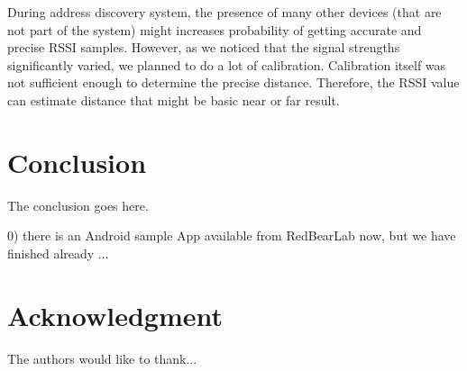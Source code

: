 \documentclass[conference,a4paper]{../../sty/IEEEtran}
\begin{document}
During address discovery system, the presence of many other devices (that are not part of the system) might 
increases probability of getting accurate and precise RSSI samples. However, as we noticed that the signal strengths significantly varied, we planned to do a lot of calibration. Calibration itself was not sufficient enough to determine the precise distance. Therefore, the RSSI value can estimate distance that might be basic near or far result. 

\section{Conclusion}
The conclusion goes here.

0) there is an Android sample App available from RedBearLab now, but we have finished already ...




\section*{Acknowledgment}


The authors would like to thank...\cite{IEEEhowto:IEEEtranpage}





\nocite*{}


\end{document}
